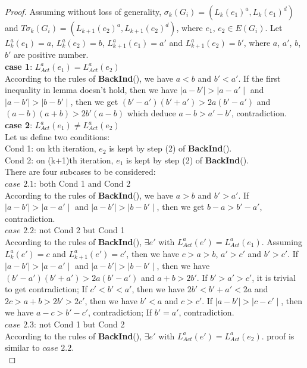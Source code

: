 \documentclass{acm_proc_article-sp}
\begin{document}
\begin{proof}
Assuming without loss of generality, $\sigma_{k}(G_{\textit{i}})=(L_{k}(e_{1})^a, L_{k}(e_{1})^d)$ and $T\sigma_{k}(G_{\textit{i}})=(L_{k+1}(e_{2})^a, L_{k+1}(e_{2})^d)$, where $e_1$, $e_2\in E(G_{\textit{i}})$. Let $L_{k}^a(e_{1})=a$, $L_{k}^a(e_{2})=b$, $L_{k+1}^a(e_{1})=a'$ and $L_{k+1}^a(e_{2})=b'$, where $a$, $a'$, $b$, $b'$ are positive number.\\
\textbf{case 1}: $L_{\textit{Act}}^a(e_{1})=L_{\textit{Act}}^a(e_{2})$\\
According to the rules of \textbf{BackInd}(), we have $a<b$ and $b'<a'$. If the first inequality in lemma doesn't hold, then we have $\mid a-b'\mid >\mid a-a'\mid$ and $\mid a-b' \mid>\mid b-b'\mid$, then we get $(b'-a')(b'+a')>2a(b'-a')$ and $(a-b)(a+b)>2b'(a-b)$ which deduce $a-b>a'-b'$, contradiction.\\
\textbf{case 2}: $L_{\textit{Act}}^a(e_{1})\neq L_{\textit{Act}}^a(e_{2})$\\
Let us define two conditions:\\
Cond 1: on kth iteration, $e_{2}$ is kept by step (2) of \textbf{BackInd}(). \\
Cond 2: on (k+1)th iteration, $e_{1}$ is kept by step (2) of \textbf{BackInd}().\\
There are four subcases to be considered:\\
\textbf{$\textit{case 2.1}$}: both Cond 1 and Cond 2\\
According to the rules of \textbf{BackInd}(), we have $a>b$ and $b'>a'$. If $\mid a-b'\mid >\mid a-a'\mid$ and $\mid a-b' \mid>\mid b-b'\mid$, then we get $b-a>b'-a'$, contradiction. \\
\textbf{$\textit{case 2.2}$}: not Cond 2 but Cond 1 \\
According to the rules of \textbf{BackInd}(), $\exists e'$ with $L_{Act}^a(e')=L_{Act}^a(e_{1})$. Assuming $L_{k}^a(e')=c$ and $L_{k+1}^a(e')=c'$, then we have $c>a>b$, $a'>c'$ and $b'>c'$. If $\mid a-b'\mid >\mid a-a'\mid$ and $\mid a-b' \mid>\mid b-b'\mid$, then we have $(b'-a')(b'+a')>2a(b'-a')$ and $a+b>2b'$. If $b'>a'>c'$, it is trivial to get contradiction; If $c'<b'<a'$, then we have $2b'<b'+a'<2a$ and $2c>a+b>2b'>2c'$, then we have $b'<a$ and $c>c'$. If $\mid a-b' \mid>\mid c-c'\mid$, then we have $a-c>b'-c'$, contradiction; If $b'=a'$, contradiction. \\
\textbf{$\textit{case 2.3}$}: not Cond 1 but Cond 2\\
According to the rules of \textbf{BackInd}(), $\exists e'$ with $L_{Act}^a(e')=L_{Act}^a(e_{2})$. proof is similar to \textbf{$\textit{case 2.2}$}.\\

\end{proof}
\end{document}
